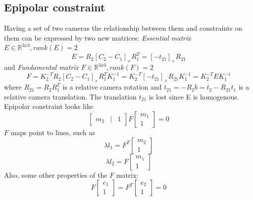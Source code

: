 \subsection{Epipolar constraint}
Having a set of two cameras the relationship between them and constraints on them can be expressed by two new matrices: 
\textit{Essential matrix} $E \in \mathbb{R}^{3x3}, rank(E) = 2$
$$
E = R_2 [C_2 - C_1]_{\times} R_1^T = [-t_{21}]_{\times}R_{21}
$$ 
and \textit{Fundamental matrix} $F \in \mathbb{R}^{3x3}, rank(F) = 2$
$$
F = K_2^{-T} R_2 [C_2 - C_1]_{\times} R_1^T K_1^{-1} = K_2^{-T} [-t_{21}]_{\times} R_{21} K_1^{-1} = K_2^{-T} E K_1^{-1}
$$
where 
$R_{21} = R_2 R_1^T$ is a relative camera rotation and 
$t_{21} = -R_2 b = t_2 - R_{21}t_1$ is a relative camera translation.
The translation $t_{21}$ is lost since E is homogenous.
Epipolar constraint looks like
$$
\begin{bmatrix} m_2 & | & 1 \end{bmatrix} F \begin{bmatrix} m_1 \\ 1 \end{bmatrix} = 0
$$
$F$ maps point to lines, such as
$$
\lambda l_1 = F^T \begin{bmatrix} m_2 \\ 1 \end{bmatrix}
$$
$$
\lambda l_2 = F \begin{bmatrix} m_1 \\ 1 \end{bmatrix}
$$
Also, some other properties of the $F$ matrix:
$$
F \begin{bmatrix} e_1 \\ 1 \end{bmatrix} = F^T \begin{bmatrix} e_2 \\ 1 \end{bmatrix} = 0
$$
